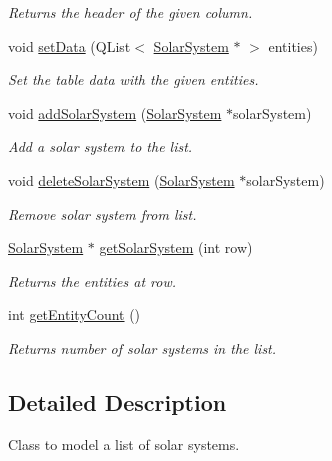 \begin{DoxyCompactItemize}
\begin{DoxyCompactList}\small\item\em \-Returns the header of the given column. \end{DoxyCompactList}\item 
void \hyperlink{classSolarSystemTableModel_ac5072386a5b96ace8a13d6aba6c94a82}{set\-Data} (\-Q\-List$<$ \hyperlink{classSolarSystem}{\-Solar\-System} $\ast$ $>$ entities)
\begin{DoxyCompactList}\small\item\em \-Set the table data with the given entities. \end{DoxyCompactList}\item 
void \hyperlink{classSolarSystemTableModel_a042c3754415bb1663496b80f677ac339}{add\-Solar\-System} (\hyperlink{classSolarSystem}{\-Solar\-System} $\ast$solar\-System)
\begin{DoxyCompactList}\small\item\em \-Add a solar system to the list. \end{DoxyCompactList}\item 
void \hyperlink{classSolarSystemTableModel_aa4822a831ab30e1baf05f6cb815f83c7}{delete\-Solar\-System} (\hyperlink{classSolarSystem}{\-Solar\-System} $\ast$solar\-System)
\begin{DoxyCompactList}\small\item\em \-Remove solar system from list. \end{DoxyCompactList}\item 
\hyperlink{classSolarSystem}{\-Solar\-System} $\ast$ \hyperlink{classSolarSystemTableModel_afe336ebf6069f087400edc501bfd1e68}{get\-Solar\-System} (int row)
\begin{DoxyCompactList}\small\item\em \-Returns the entities at row. \end{DoxyCompactList}\item 
int \hyperlink{classSolarSystemTableModel_aaa3593e268ef42ef4b0e705ce29697ed}{get\-Entity\-Count} ()
\begin{DoxyCompactList}\small\item\em \-Returns number of solar systems in the list. \end{DoxyCompactList}\end{DoxyCompactItemize}


\subsection{\-Detailed \-Description}
\-Class to model a list of solar systems.

